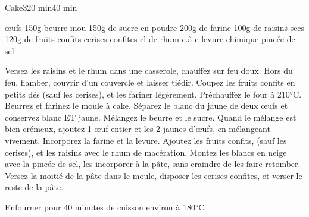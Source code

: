 \begin{recette}{Cake}{3}{20 min}{40 min}
\begin{ingredients}
 œufs
\ingredient 150g beurre mou
\ingredient 150g de sucre en poudre
\ingredient 200g de farine
\ingredient 100g de raisins secs
\ingredient 120g de fruits confits
\ingredient cerises confites
 cl de rhum
 c.à c levure chimique
 pincée de sel
\end{ingredients}

\begin{preparation}
\etape Versez les raisins et le rhum dans une casserole, chauffez sur feu doux. Hors du feu, flamber, couvrir d'un couvercle et laisser tiédir.
\etape Coupez les fruits confits en petits dés (sauf les cerises), et les fariner légèrement.
\etape Préchauffez le four à 210°C. Beurrez et farinez le moule à cake.
\etape Séparez le blanc du jaune de deux œufs et conservez blanc ET jaune.
\etape Mélangez le beurre et le sucre. Quand le mélange est bien crémeux, ajoutez 1 œuf entier et les 2 jaunes d'œufs, en mélangeant vivement.
\etape Incorporez la farine et la levure.
\etape Ajoutez les fruits confits, (sauf les cerises), et les raisins avec le rhum de macération.
\etape Montez les blancs en neige avec la pincée de sel, les incorporer à la pâte, sans craindre de les faire retomber.
\etape Versez la moitié de la pâte dans le moule, disposer les cerises confites, et verser le reste de la pâte.

\end{preparation}

\begin{cuisson}
Enfourner pour 40 minutes de cuisson environ à 180°C
\end{cuisson}
\end{recette}

